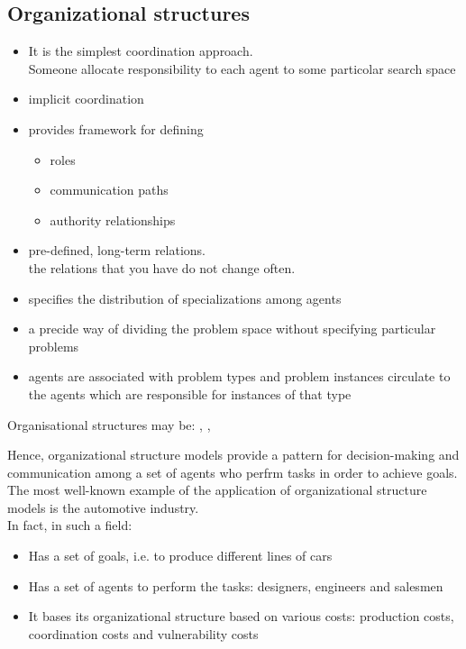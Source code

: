 \subsection{Organizational structures}

\begin{itemize}
\item It is the simplest coordination approach.\\
Someone allocate responsibility to each agent to some particolar search space
\item implicit coordination
\item provides framework for defining
\begin{itemize}
\item roles
\item communication paths
\item authority relationships
\end{itemize}
\item pre-defined, long-term relations.\\
the relations that you have do not change often.
\item specifies the distribution of specializations among agents
\item a precide way of dividing the problem space without specifying particular problems
\item agents are associated with problem types and problem instances circulate to the agents which are responsible for instances of that type
\end{itemize}

Organisational structures may be: , , 

Hence, organizational structure models provide a pattern for decision-making and communication among a set of agents who perfrm tasks in order to achieve goals. The most well-known example of the application of organizational structure models is the automotive industry.\\
In fact, in such a field:
\begin{itemize}
\item Has a set of goals, i.e. to produce different lines of cars
\item Has a set of agents to perform the tasks: designers, engineers and salesmen
\item It bases its organizational structure based on various costs: production costs, coordination costs and vulnerability costs
\end{itemize}
